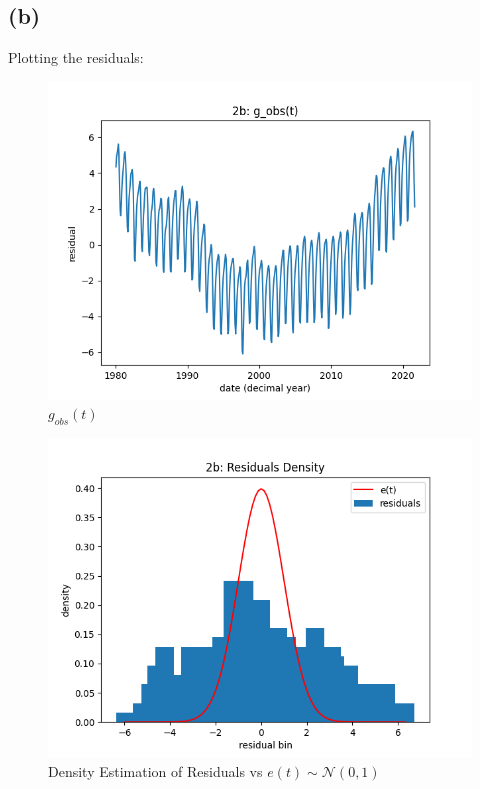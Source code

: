 \documentclass[12pt]{article}
\begin{document}
\subsection*{(b)}

Plotting the residuals:

\begin{figure}[h]
\centering
\includegraphics[scale=0.5]{outputs/q2/b-residuals-timeseries}
\caption{$g_{obs}(t)$}
\label{fig:b-residuals-timeseries}
\end{figure}

\begin{figure}[h]
\centering
\includegraphics[scale=0.5]{outputs/q2/b-residuals-density-estimation}
\caption{Density Estimation of Residuals vs $e(t) \sim \mathcal{N}(0, 1)$}
\label{fig:b-residuals-density-estimation}
\end{figure}
\end{document}
